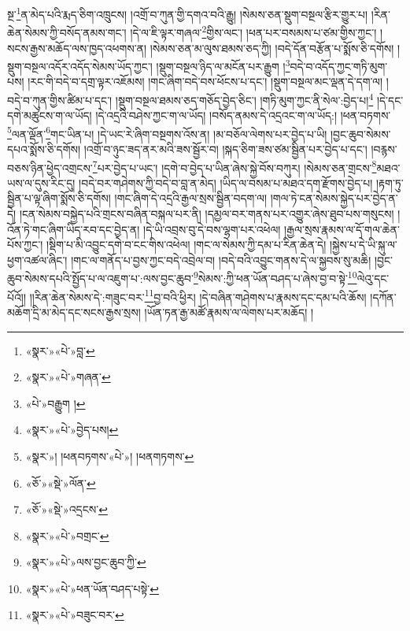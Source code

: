 སྔ་\footnote{«སྣར་»«པེ་»བླ་}ན་མེད་པའི་རྨད་ཅིག་འཁྲུངས། །འགྲོ་བ་ཀུན་གྱི་དགའ་བའི་རྒྱུ། །སེམས་ཅན་སྡུག་བསྔལ་རྩིར་གྱུར་པ། །རིན་ཆེན་སེམས་ཀྱི་བསོད་ནམས་གང་། །དེ་ལ་ཇི་ལྟར་གཞལ་\footnote{«སྣར་»«པེ་»གཞན་}གྱིས་ལང་། །ཕན་པར་བསམས་པ་ཙམ་གྱིས་ཀྱང་། །སངས་རྒྱས་མཆོད་ལས་ཁྱད་འཕགས་ན། །སེམས་ཅན་མ་ལུས་ཐམས་ཅད་ཀྱི། །བདེ་དོན་བརྩོན་པ་སྨོས་ཅི་དགོས། །སྡུག་བསྔལ་འདོར་འདོད་སེམས་ཡོད་ཀྱང་། །སྡུག་བསྔལ་ཉིད་ལ་མངོན་པར་རྒྱུག །\footnote{«པེ་»བརྒྱུག །}བདེ་བ་འདོད་ཀྱང་གཏི་མུག་པས། །རང་གི་བདེ་བ་དགྲ་ལྟར་འཇོམས། །གང་ཞིག་བདེ་བས་ཕོངས་པ་དང་། །སྡུག་བསྔལ་མང་ལྡན་དེ་དག་ལ། །བདེ་བ་ཀུན་གྱིས་ཚིམ་པ་དང་། །སྡུག་བསྔལ་ཐམས་ཅད་གཅོད་བྱེད་ཅིང་། །གཏི་མུག་ཀྱང་ནི་སེལ་:བྱེད་པ།\footnote{«སྣར་»«པེ་»བྱེད་པས།} །དེ་དང་དགེ་མཚུངས་ག་ལ་ཡོད། །དེ་འདྲའི་བཤེས་ཀྱང་ག་ལ་ཡོད། །བསོད་ནམས་དེ་འདྲའང་ག་ལ་ཡོད:། །ཕན་བཏགས་\footnote{«སྣར་»། །ཕནབཏགས་«པེ་»། །ཕནགཏགས་}ལན་ལྡོན་\footnote{«ཅོ་»«སྡེ་»ལོན་}གང་ཡིན་པ། །དེ་ཡང་རེ་ཞིག་བསྔགས་འོས་ན། །མ་བཅོལ་ལེགས་པར་བྱེད་པ་ཡི། །བྱང་ཆུབ་སེམས་དཔའ་སྨོས་ཅི་དགོས། །འགྲོ་བ་ཉུང་ཟད་ནར་མའི་ཟས་སྦྱོར་བ། །སྐད་ཅིག་ཟས་ཙམ་སྦྱིན་པར་བྱེད་པ་དང་། །བརྙས་བཅས་ཉིན་ཕྱེད་འགྲངས་\footnote{«ཅོ་»«སྡེ་»འདྲངས་}པར་བྱེད་པ་ཡང་། །དགེ་བ་བྱེད་པ་ཡིན་ཞེས་སྐྱེ་བོས་བཀུར། །སེམས་ཅན་གྲངས་\footnote{«སྣར་»«པེ་»བགྲང་}མཐའ་ཡས་ལ་དུས་རིང་དུ། །བདེ་བར་གཤེགས་ཀྱི་བདེ་བ་བླ་ན་མེད། །ཡིད་ལ་བསམ་པ་མཐའ་དག་རྫོགས་བྱེད་པ། །རྟག་ཏུ་སྦྱིན་པ་ལྟ་ཞིག་སྨོས་ཅི་དགོས། །གང་ཞིག་དེ་འདྲའི་རྒྱལ་སྲས་སྦྱིན་བདག་ལ། །གལ་ཏེ་ངན་སེམས་སྐྱེད་པར་བྱེད་ན་དེ། །ངན་སེམས་བསྐྱེད་པའི་གྲངས་བཞིན་བསྐལ་པར་ནི། །དམྱལ་བར་གནས་པར་འགྱུར་ཞེས་ཐུབ་པས་གསུངས། །འོན་ཏེ་གང་ཞིག་ཡིད་རབ་དང་བྱེད་ན། །དེ་ཡི་འབྲས་བུ་དེ་བས་ལྷག་པར་འཕེལ། །རྒྱལ་སྲས་རྣམས་ལ་དོ་གལ་ཆེན་པོས་ཀྱང་། །སྡིག་པ་མི་འབྱུང་དགེ་བ་ངང་གིས་འཕེལ། །གང་ལ་སེམས་ཀྱི་དམ་པ་རིན་ཆེན་དེ། །སྐྱེས་པ་དེ་ཡི་སྐུ་ལ་ཕྱག་འཚལ་ཞིང་། །གང་ལ་གནོད་པ་བྱས་ཀྱང་བདེ་འབྲེལ་བ། །བདེ་བའི་འབྱུང་གནས་དེ་ལ་སྐྱབས་སུ་མཆི། །བྱང་ཆུབ་སེམས་དཔའི་སྤྱོད་པ་ལ་འཇུག་པ་:ལས་བྱང་ཆུབ་\footnote{«སྣར་»«པེ་»ལས་བྱང་ཆུབ་ཀྱི་}སེམས་:ཀྱི་ཕན་ཡོན་བཤད་པ་ཞེས་བྱ་བ་སྟེ་\footnote{«སྣར་»«པེ་»ཕན་ཡོན་བཤད་པསྟེ་}ལེའུ་དང་པོའོ།། །།རིན་ཆེན་སེམས་དེ་:གཟུང་བར་\footnote{«སྣར་»«པེ་»བཟུང་བར་}བྱ་བའི་ཕྱིར། །དེ་བཞིན་གཤེགས་པ་རྣམས་དང་དམ་པའི་ཆོས། །དཀོན་མཆོག་དྲི་མ་མེད་དང་སངས་རྒྱས་སྲས། །ཡོན་ཏན་རྒྱ་མཚོ་རྣམས་ལ་ལེགས་པར་མཆོད། །
